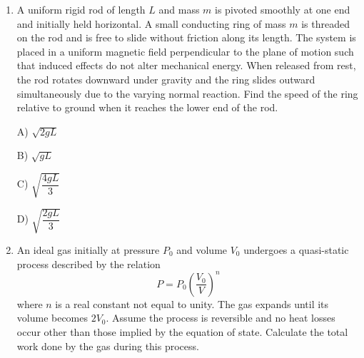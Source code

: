 \documentclass[12pt]{article}
\begin{document}
\begin{enumerate}
A) $\dfrac{mg}{qv}$

B) $\dfrac{mv}{qR}$

C) $\dfrac{m}{q}\sqrt{\dfrac{g}{R}}$

D) $\dfrac{mgR}{qv}$

\item 
A uniform rigid rod of length $L$ and mass $m$ is pivoted smoothly at one end and initially held horizontal. 
A small conducting ring of mass $m$ is threaded on the rod and is free to slide without friction along its length. 
The system is placed in a uniform magnetic field perpendicular to the plane of motion such that induced effects do not alter mechanical energy. 
When released from rest, the rod rotates downward under gravity and the ring slides outward simultaneously due to the varying normal reaction. 
Find the speed of the ring relative to ground when it reaches the lower end of the rod.

\begin{center}
\end{center}

A) $\sqrt{2gL}$

B) $\sqrt{gL}$

C) $\sqrt{\dfrac{4gL}{3}}$

D) $\sqrt{\dfrac{2gL}{3}}$

\item

An ideal gas initially at pressure $P_0$ and volume $V_0$ undergoes a quasi-static process described by the relation 
\[
P = P_0\left(\dfrac{V_0}{V}\right)^n
\]
where $n$ is a real constant not equal to unity. The gas expands until its volume becomes $2V_0$. 
Assume the process is reversible and no heat losses occur other than those implied by the equation of state. 
Calculate the total work done by the gas during this process.


\end{enumerate}
\end{document}
